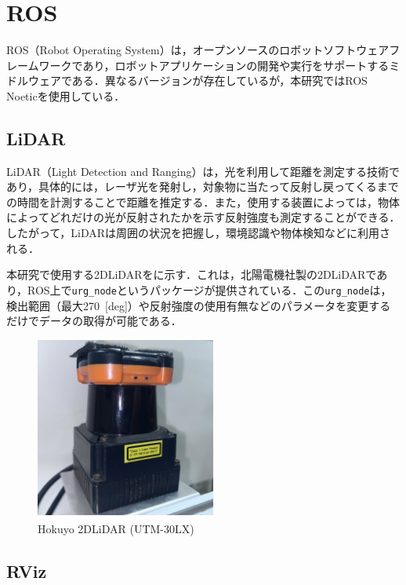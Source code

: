 
\section{ROS}

ROS（Robot Operating System）\cite{ros}は，オープンソースのロボットソフトウェアフレームワークであり，ロボットアプリケーションの開発や実行をサポートするミドルウェアである．異なるバージョンが存在しているが，本研究ではROS Noeticを使用している．

\subsection{LiDAR}

  LiDAR（Light Detection and Ranging）は，光を利用して距離を測定する技術であり，具体的には，レーザ光を発射し，対象物に当たって反射し戻ってくるまでの時間を計測することで距離を推定する．また，使用する装置によっては，物体によってどれだけの光が反射されたかを示す反射強度も測定することができる．したがって，LiDARは周囲の状況を把握し，環境認識や物体検知などに利用される．

  本研究で使用する2DLiDARをに示す．これは，北陽電機社製の2DLiDARであり，ROS上で\texttt{urg\_node}\cite{urg_node}というパッケージが提供されている．この\texttt{urg\_node}は，検出範囲（最大270 \,[deg]）や反射強度の使用有無などのパラメータを変更するだけでデータの取得が可能である．

  \begin{figure}[h]
    \centering
    \includegraphics[height=6cm] {images/pdf/RobotGuidance_hokuyo_lidar}
    \caption[Hokuyo 2DLiDAR (UTM-30LX)]{Hokuyo 2DLiDAR (UTM-30LX)}
    \label{Fig:hokuyo_lidar}
  \end{figure}

\newpage

\subsection{RViz}

